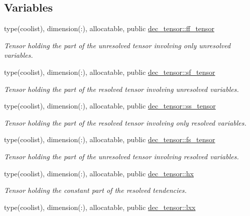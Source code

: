 \subsection*{Variables}
\begin{DoxyCompactItemize}
\item 
type(coolist), dimension(\+:), allocatable, public \hyperlink{namespacedec__tensor_ac70c58053d278b0c95194704a1e48787}{dec\+\_\+tensor\+::ff\+\_\+tensor}
\begin{DoxyCompactList}\small\item\em Tensor holding the part of the unresolved tensor involving only unresolved variables. \end{DoxyCompactList}\item 
type(coolist), dimension(\+:), allocatable, public \hyperlink{namespacedec__tensor_a3f0627e15eba5158920d63deec399669}{dec\+\_\+tensor\+::sf\+\_\+tensor}
\begin{DoxyCompactList}\small\item\em Tensor holding the part of the resolved tensor involving unresolved variables. \end{DoxyCompactList}\item 
type(coolist), dimension(\+:), allocatable, public \hyperlink{namespacedec__tensor_a1e5a6c8bbb0cfa7d44245e0567b4ffca}{dec\+\_\+tensor\+::ss\+\_\+tensor}
\begin{DoxyCompactList}\small\item\em Tensor holding the part of the resolved tensor involving only resolved variables. \end{DoxyCompactList}\item 
type(coolist), dimension(\+:), allocatable, public \hyperlink{namespacedec__tensor_ac3f4574fab9acab6741a1660a49442b9}{dec\+\_\+tensor\+::fs\+\_\+tensor}
\begin{DoxyCompactList}\small\item\em Tensor holding the part of the unresolved tensor involving resolved variables. \end{DoxyCompactList}\item 
type(coolist), dimension(\+:), allocatable, public \hyperlink{namespacedec__tensor_ac7de63dc4f2ca5ef353c9ee4442e6f78}{dec\+\_\+tensor\+::hx}
\begin{DoxyCompactList}\small\item\em Tensor holding the constant part of the resolved tendencies. \end{DoxyCompactList}\item 
type(coolist), dimension(\+:), allocatable, public \hyperlink{namespacedec__tensor_a9a9feb72e769222453930a8e4a5fdea3}{dec\+\_\+tensor\+::lxx}

\end{DoxyCompactItemize}
